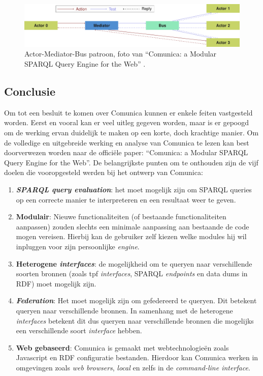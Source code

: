 \begin{figure}
    \centering
    \includegraphics[width=\linewidth]{images/comunica-actor-mediator-bus.png}
    \caption{Actor-Mediator-Bus patroon, foto van ``Comunica: a Modular SPARQL Query Engine for the Web'' \cite{taelman2018comunica}.}
    \label{fig:actor-mediator-bus}
\end{figure}



\subsection{Conclusie}
Om tot een besluit te komen over Comunica kunnen er enkele feiten vastgesteld worden. Eerst en vooral kan er veel uitleg gegeven worden, maar is er gepoogd om de werking ervan duidelijk te maken op een korte, doch krachtige manier. Om de volledige en uitgebreide werking en analyse van Comunica te lezen kan best doorverwezen worden naar de officiële paper: ``Comunica: a Modular SPARQL Query Engine for the Web''. De belangrijkste punten om te onthouden zijn de vijf doelen die vooropgesteld werden bij het ontwerp van Comunica:
\begin{enumerate}
    \item \textbf{\textit{SPARQL query evaluation}}: het moet mogelijk zijn om SPARQL queries op een correcte manier te interpreteren en een resultaat weer te geven.
    \item \textbf{Modulair}: Nieuwe functionaliteiten (of bestaande functionaliteiten aanpassen) zouden slechts een minimale aanpassing aan bestaande de code mogen vereisen. Hierbij kan de gebruiker zelf kiezen welke modules hij wil inpluggen voor zijn persoonlijke \textit{engine}.
    \item \textbf{Heterogene \textit{interfaces}}: de mogelijkheid om te queryen naar verschillende soorten bronnen (zoals \acrshort{tpf} \textit{interfaces}, SPARQL \textit{endpoints} en data dums in RDF) moet mogelijk zijn.
    \item \textbf{\textit{Federation}}: Het moet mogelijk zijn om gefedereerd te queryen. Dit betekent queryen naar verschillende bronnen. In samenhang met de heterogene \textit{interfaces} betekent dit dus queryen naar verschillende bronnen die mogelijks een verschillende soort \textit{interface} hebben.
    \item \textbf{Web gebaseerd}: Comunica is gemaakt met webtechnologieën zoals Javascript en RDF configuratie bestanden. Hierdoor kan Comunica werken in omgevingen zoals \textit{web browsers}, \textit{local} en zelfs in de \textit{command-line interface}.
\end{enumerate}